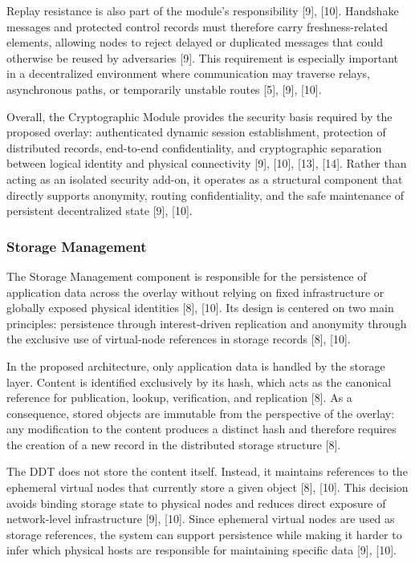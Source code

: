 \documentclass[12pt,a4paper]{article}
\begin{document}
Replay resistance is also part of the module's responsibility [9], [10]. Handshake messages and protected control records must therefore carry freshness-related elements, allowing nodes to reject delayed or duplicated messages that could otherwise be reused by adversaries [9]. This requirement is especially important in a decentralized environment where communication may traverse relays, asynchronous paths, or temporarily unstable routes [5], [9], [10].

Overall, the Cryptographic Module provides the security basis required by the proposed overlay: authenticated dynamic session establishment, protection of distributed records, end-to-end confidentiality, and cryptographic separation between logical identity and physical connectivity [9], [10], [13], [14]. Rather than acting as an isolated security add-on, it operates as a structural component that directly supports anonymity, routing confidentiality, and the safe maintenance of persistent decentralized state [9], [10].

\subsubsection{Storage Management}

The Storage Management component is responsible for the persistence of application data across the overlay without relying on fixed infrastructure or globally exposed physical identities [8], [10]. Its design is centered on two main principles: persistence through interest-driven replication and anonymity through the exclusive use of virtual-node references in storage records [8], [10].

In the proposed architecture, only application data is handled by the storage layer. Content is identified exclusively by its hash, which acts as the canonical reference for publication, lookup, verification, and replication [8]. As a consequence, stored objects are immutable from the perspective of the overlay: any modification to the content produces a distinct hash and therefore requires the creation of a new record in the distributed storage structure [8].


\thesisddttikz


The DDT does not store the content itself. Instead, it maintains references to the ephemeral virtual nodes that currently store a given object [8], [10]. This decision avoids binding storage state to physical nodes and reduces direct exposure of network-level infrastructure [9], [10]. Since ephemeral virtual nodes are used as storage references, the system can support persistence while making it harder to infer which physical hosts are responsible for maintaining specific data [9], [10].
\end{document}
